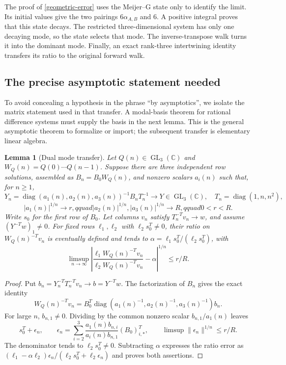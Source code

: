 \documentclass[11pt]{article}
\newtheorem{lemma}{Lemma}
\begin{document}
The proof of \eqref{geometric-error} uses the Meijer--G state only to
identify the limit. Its initial values give the two pairings
$6\alpha_{A,B}$ and $6$. A positive integral proves that this state
decays. The restricted three-dimensional system has only one decaying
mode, so the state selects that mode. The inverse-transpose walk turns
it into the dominant mode. Finally, an exact rank-three intertwining
identity transfers its ratio to the original forward walk.

\subsection{The precise asymptotic statement needed}
To avoid concealing a hypothesis in the phrase ``by asymptotics'',
we isolate the matrix statement used in that transfer. A modal-basis
theorem for rational difference systems must supply the basis in the
next lemma. This is the general asymptotic theorem to formalize or
import; the subsequent transfer is elementary linear algebra.

\begin{lemma}[Dual mode transfer]\label{dual-mode-transfer}
Let $Q(n)\in\operatorname{GL}_3(\mathbb C)$ and
$W_Q(n)=Q(0)\cdots Q(n-1)$. Suppose there are three independent row
solutions, assembled as $B_n=B_0W_Q(n)$, and nonzero scalars $a_i(n)$
such that, for $n\geq1$,
\[
 Y_n=\operatorname{diag}(a_1(n),a_2(n),a_3(n))^{-1}B_nT_n^{-1}
 \longrightarrow Y\in\operatorname{GL}_3(\mathbb C),\quad
 T_n=\operatorname{diag}(1,n,n^2),
\]
\[
 |a_1(n)|^{1/n}\to r,qquad
 |a_2(n)|^{1/n},|a_3(n)|^{1/n}\to R,qquad 0<r<R.
\]
Write $s_0$ for the first row of $B_0$. Let columns $v_n$ satisfy
$T_n^{-T}v_n\to w$, and assume $(Y^{-T}w)_1\ne0$.
For fixed rows $\ell_1,\ell_2$ with $\ell_2s_0^T\ne0$, their ratio
on $W_Q(n)^{-T}v_n$ is eventually defined and tends to
$\alpha=\ell_1s_0^T/(\ell_2s_0^T)$, with
\[
 \limsup_{n\to\infty}
 \left|\frac{\ell_1W_Q(n)^{-T}v_n}
 {\ell_2W_Q(n)^{-T}v_n}-\alpha\right|^{1/n}\leq r/R.
\]
\end{lemma}
\begin{proof}
Put $b_n=Y_n^{-T}T_n^{-T}v_n\to b=Y^{-T}w$.
The factorization of $B_n$ gives the exact identity
\[
 W_Q(n)^{-T}v_n
 =B_0^T\operatorname{diag}(a_1(n)^{-1},a_2(n)^{-1},a_3(n)^{-1})b_n.
\]
For large $n$, $b_{n,1}\ne0$. Dividing by the common nonzero scalar
$b_{n,1}/a_1(n)$ leaves
\[
 s_0^T+\epsilon_n,\qquad
 \epsilon_n=\sum_{i=2}^3
 \frac{a_1(n)b_{n,i}}{a_i(n)b_{n,1}}(B_0)_{i,*}^T,
 \qquad\limsup\|\epsilon_n\|^{1/n}\leq r/R.
\]
The denominator tends to $\ell_2s_0^T\ne0$.
Subtracting $\alpha$ expresses the ratio error as
$(\ell_1-\alpha\ell_2)\epsilon_n/
 (\ell_2s_0^T+\ell_2\epsilon_n)$ and proves both assertions.
\end{proof}
\end{document}
